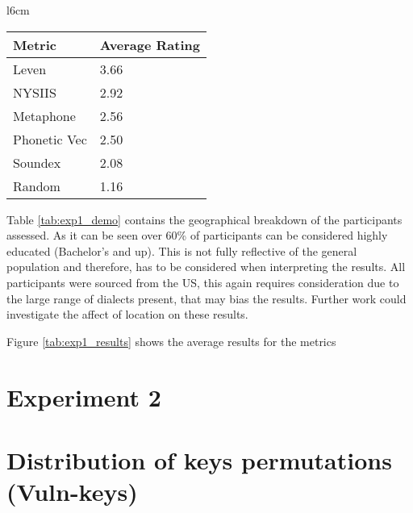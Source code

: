 \begin{wrapfigure}{l}{6cm}
    \centering
    \begin{tabular}{|l|l|}
        \hline
        Metric & Average Rating \\
        \hline
        Leven     & 3.66 \\
        NYSIIS    & 2.92 \\
        Metaphone & 2.56 \\
        Phonetic Vec & 2.50 \\
        Soundex & 2.08 \\
        \hline
        Random  & 1.16 \\
        \hline
    \end{tabular}
    \caption{Average metric performance}
    \label{tab:exp1_results}
\end{wrapfigure}

Table \ref{tab:exp1_demo} contains the geographical breakdown of the participants assessed. As it can be seen over 60\% of participants can be considered highly educated (Bachelor’s and up). This is not fully reflective of the general population and therefore, has to be considered when interpreting the results. All participants were sourced from the US, this again requires consideration due to the large range of dialects present, that may bias the results. Further work could investigate the affect of location on these results.

Figure \ref{tab:exp1_results} shows the average results for the metrics









\section{Experiment 2}

\section{Distribution of keys permutations (Vuln-keys)}